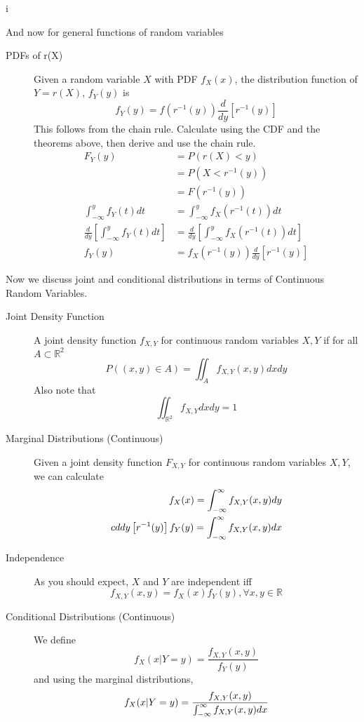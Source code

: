 i\documentclass[10pt]{article}
\begin{document}
And now for general functions of random variables

\begin{description}
    \item[PDFs of r(X)] Given a random variable $X$ with PDF $f_X(x)$, the distribution
        function of $Y = r(X)$, $f_Y(y)$ is
        \[ f_Y(y) = f(r^{-1}(y))\frac{d}{dy}\left[r^{-1}(y)\right] \]
        This follows from the chain rule.
        Calculate using the CDF and the theorems above, then derive and use the chain rule. 
        \begin{align*}
            F_Y(y) &= P(r(X) < y) \\
                   &= P(X < r^{-1}(y)) \\
                   &= F(r^{-1}(y)) \\
            \int_{-\infty}^{y} f_Y(t)dt &= \int_{-\infty}^{y} f_X(r^{-1}(t))dt \\
            \frac{d}{dy}\left[ \int_{-\infty}^{y} f_Y(t)dt\right] &= \frac{d}{dy}\left[ \int_{-\infty}^{y} f_X(r^{-1}(t))dt\right] \\
            f_Y(y) &= f_X(r^{-1}(y))\frac{d}{dy}\left[r^{-1}(y)\right]
        \end{align*}
\end{description}

Now we discuss joint and conditional distributions in terms of Continuous Random Variables.

\begin{description}
    \item[Joint Density Function] A joint density function $f_{X,Y}$ for continuous random variables $X,Y$ if for
        all $A \subset \mathbb{R}^2$
        \[ P((x,y) \in A)  = \iint_A f_{X,Y}(x,y)dxdy \]
        Also note that
        \[ \iint_{\mathbb{R}^2} f_{X,Y}dxdy = 1 \]
    \item[Marginal Distributions (Continuous)] Given a joint density function $F_{X,Y}$ for continuous random variables $X,Y$, we can calculate 
        \begin{align*}
            f_X(x) = \int_{-\infty}^{\infty} f_{X,Y}(x,y)dy \\c{d}{dy}\left[r^{-1}(y)\right]
            f_Y(y) = \int_{-\infty}^{\infty} f_{X,Y}(x,y)dx \\
        \end{align*}
    \item[Independence] As you should expect, $X$ and $Y$ are independent iff
        \[ f_{X,Y}(x,y) = f_X(x)f_Y(y), \forall x,y \in \mathbb{R}\]
    \item[Conditional Distributions (Continuous)] We define
        \[ f_X(x | Y = y) = \frac{f_{X,Y}(x,y)}{f_Y(y)} \]
        and using the marginal distributions,
        \[ f_X(x | Y = y) = \frac{f_{X,Y}(x,y)}{\int_{-\infty}^{\infty} f_{X,Y}(x,y)dx} \]
\end{description}
\end{document}
